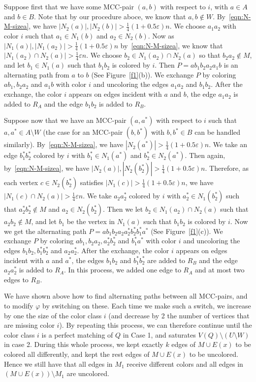 \documentclass[11pt, oneside]{article}
\newcommand{\ve}{\varepsilon}
\begin{document}
Suppose first  that we have some MCC-pair $(a,b)$ with respect to $i$, with $a\in A$ and $b\in B$. Note that by our procedure aboce, we know that $a,b\not\in W$. By~\eqref{eqn:N-M-sizea}, we have 
$
|N_2(a)|,  |N_2(b)|>\tfrac{1}{4}(1+0.5\ve) n.
$
We choose $a_1a_2$ with color $i$ such that $a_1\in N_1(b)$
and $a_2\in N_2(b)$. Now as $|N_1(a)|, |N_1(a_2)| >\tfrac{1}{4}(1+0.5\ve) n$ by~\eqref{eqn:N-M-sizea}, we know that $|N_1(a_2)\cap N_2(a) |>\frac{1}{4}\ve n$. We choose $b_2\in N_1(a_2)\cap N_2(a)$
so that  $b_2a_2 \not\in M$, 
and let $b_1\in N_1(a)$ such that $b_1b_2$ is colored by $i$. 
Then $P=ab_1b_2a_2a_1 b$ is an alternating path from $a$ to $b$ (See Figure~\ref{f1}(b)). We exchange $P$ by coloring $ab_1, b_2a_2$ and $a_1b$
with color $i$ and uncoloring the edges $a_1a_2$ and $b_1b_2$. 
After the exchange,  the color $i$ appears on edges incident with $a$ and $b$,
the edge $a_1a_2$ is added to $R_A$
and the edge $b_1b_2$ is added to $R_B$. 




Suppose now that we have an MCC-pair $(a,a^*)$
with respect to  $i$ such that $a,a^* \in A\setminus W$ (the case for an MCC-pair $(b,b^*)$
with $b,b^* \in B$ can be handled similarly). 
By~\eqref{eqn:N-M-sizea}, we have  $|N_2(a^*)|>\tfrac{1}{4}(1+0.5\ve) n$.
We take an edge $b_1^*b_2^*$ colored by $i$ with $b_1^* \in N_1(a^*)$ and  $b_2^*\in N_2(a^*)$.  
Then again, by~\eqref{eqn:N-M-sizea}, we have 
$
|N_2(a)|,  |N_2(b_2^*)|>\tfrac{1}{4}(1+0.5\ve) n.  
$
Therefore, as each vertex  $c\in N_2(b_2^*)$ 
satisfies $|N_1(c)|>\tfrac{1}{4}(1+0.5\ve) n$,  we have $|N_1(c)\cap N_2(a)| >\tfrac{1}{4}\ve n$. We take $a_2a_2^*$ colored by $i$ with $ a_2^*\in N_1(b_2^*)$ such that $a_2^*b_2^*\not\in M$ and  $a_2\in   N_2(b_2^*)$.   
Then we let $b_2\in N_1(a_2)\cap N_2(a)$ such that $a_2b_2\not\in M$, and let $b_1$
be the vertex in $N_1(a)$ such that $b_1b_2$ is colored by $i$. 
Now we get the alternating path $P=ab_1b_2 a_2 a_2^* b_2^* b_1^* a^*$ (See Figure~\ref{f1}(c)).  
We exchange $P$ by coloring $ab_1, b_2a_2, a_2^*b_2^*$ and $b_1^*a^*$
with color $i$ and uncoloring the edges $b_1b_2, b_1^*b_2^*$ and $a_2a_2^*$. 
After the exchange,  the color $i$ appears on edges incident with $a$ and $a^*$,
the edges $b_1b_2$ and $b_1^*b_2^*$ are added to $R_B$
and the edge $a_2a_2^*$ is added to $R_A$.  In this process, 
we  added  one edge  to $R_A$
and at most two edges to $R_B$. 



We have shown above how to find alternating paths between all MCC-pairs, and to modify $\varphi$ by switching on these.  Each time we make such a switch, we increase by one the size of the color class $i$ (and decrease by 2 the number of vertices that are missing color $i$). By repeating this process, we can therefore continue until the color class $i$ is a perfect matching of $Q$ in Case 1, and saturates $V(Q)\setminus (U\setminus W)$ in case 2. During this whole process, we  kept exactly  $k$ edges of $M\cup E(x)$ to be colored all differently, and kept the rest edges of 
$M\cup E(x)$ to be uncolored. 
 Hence we still have that all edges in $M_1$ receive different colors and all edges in $(M \cup E(x))\setminus M_1$ are uncolored. \\
\end{document}
